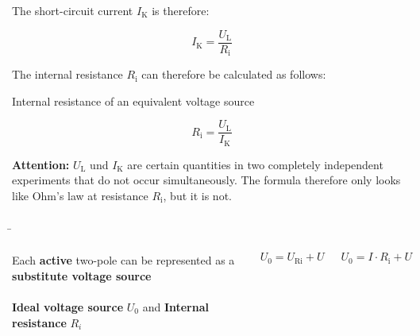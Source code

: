\begin{frame}
{        The short-circuit current $I_\mathrm{K}$ is therefore:		
		
		
		
		\begin{equation*}
			I_\mathrm{K} = \frac{U_\mathrm{L}}{R_\mathrm{i}}
		\end{equation*}
		
        The internal resistance $R_\mathrm{i}$ can therefore be calculated as follows:

		\begin{Key point}{Internal resistance of an equivalent voltage source}{}
			
			\begin{equation*}
				R_\mathrm{i} = \frac{U_\mathrm{L}}{I_\mathrm{K}}
			\end{equation*}
			
		\end{Key point}
		
		\textbf{Attention:} $U_\mathrm{L}$ und $I_\mathrm{K}$ are certain quantities in two completely independent experiments that 
        do not occur simultaneously. The formula therefore only looks like Ohm's law at resistance $R_\mathrm{i}$,
        but it is not.

		
		
	}
	
	
	
	
	
	\b{
	
		\begin{columns}
			
			
			Each \textbf{active} two-pole can be represented as a \textbf{substitute voltage source}\\
			
			\phantom{text}\\
			
			\textbf{Ideal voltage source} $U_0$ and 
			\textbf{Internal resistance} $R_i$
			
			\begin{equation*}
				U_0 = U_\mathrm{Ri} + U
			\end{equation*}
			
			\begin{equation*}
				U_0 =I \cdot R_\mathrm{i} + U
			\end{equation*}
			
\end{columns}}
\end{frame}

